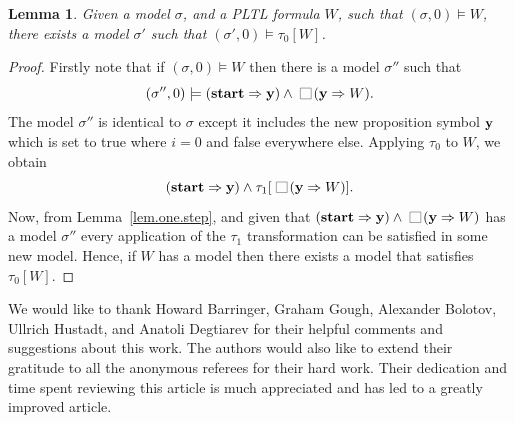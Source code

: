 \documentclass[nohyperref]{acmtrans2f}
\newcommand{\always}{\raisebox{-.2ex}{
                           \mbox{\unitlength=0.9ex
                           \begin{picture}(2,2)
                           \linethickness{0.06ex}
                           \put(0,0){\line(1,0){2}}
                           \put(0,2){\line(1,0){2}}
                           \put(0,0){\line(0,1){2}}
                           \put(2,0){\line(0,1){2}}
                           \end{picture}}}
                          \,}
\let\imp=\Rightarrow
\def\lstart{\hbox{\rm\bf start}}
\newtheorem{seclemma}{Lemma}[section]
\begin{document}
\begin{seclemma}
\label{formula.imp.tran}
Given a model $\sigma$, and a PLTL formula $W$, such that $(\sigma,0) \models
W$, there exists a model $\sigma'$ such that $(\sigma',0) \models \tau_0[W]$.
\end{seclemma}
\begin{proof}
Firstly note that if $(\sigma,0) \models W$ then there is a model
$\sigma''$ such that 
$$(\sigma'',0) \models (\lstart \imp {\bf y}) \land \always ({\bf y} \imp W).$$
%
The model $\sigma''$ is identical to $\sigma$ except it includes the
new proposition symbol ${\bf y}$ which is set to true where $i = 0$ and false
everywhere else. Applying $\tau_0$ to $W$, we obtain 
$$(\lstart \imp {\bf y}) \land \tau_1[\always({\bf y} \imp W)].$$
%
Now, from Lemma~\ref{lem.one.step}, and given that $(\lstart \imp {\bf y})
\land \always ({\bf y} \imp W)$ has a model $\sigma''$ every application of
the $\tau_1$ transformation can be satisfied in some new model. Hence,
if $W$ has a model then there exists a model that satisfies
$\tau_0[W]$.
%
\end{proof}
%
\begin{acks}
We
would like to thank Howard Barringer, Graham Gough, Alexander Bolotov,
Ullrich Hustadt, and Anatoli Degtiarev for their helpful comments and
suggestions about this work. The 
authors would also like to extend their gratitude to all the anonymous
referees for their hard work. Their dedication and time spent reviewing
this article is much appreciated and has led to a greatly improved article.
\end{acks}
\end{document}
